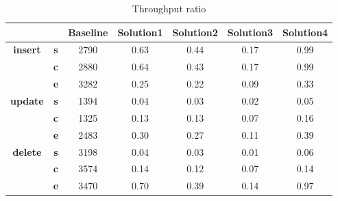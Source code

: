 \begin{table}[h]
\centering
\caption{Throughput ratio}\label{t:}
\begin{tabular}{ccccccc}
\toprule
&&\textbf{Baseline} & \textbf{Solution1} & \textbf{Solution2} & \textbf{Solution3} & \textbf{Solution4}\\
\midrule
\multirow{3}{*}{\textbf{insert}} & \textbf{s} & 2790 & 0.63 & 0.44 & 0.17 & 0.99\\
 & \textbf{c} & 2880 & 0.64 & 0.43 & 0.17 & 0.99\\
 & \textbf{e} & 3282 & 0.25 & 0.22 & 0.09 & 0.33\\
\midrule
\multirow{3}{*}{\textbf{update}} & \textbf{s} & 1394 & 0.04 & 0.03 & 0.02 & 0.05\\
 & \textbf{c} & 1325 & 0.13 & 0.13 & 0.07 & 0.16\\
 & \textbf{e} & 2483 & 0.30 & 0.27 & 0.11 & 0.39\\
\midrule
\multirow{3}{*}{\textbf{delete}} & \textbf{s} & 3198 & 0.04 & 0.03 & 0.01 & 0.06\\
 & \textbf{c} & 3574 & 0.14 & 0.12 & 0.07 & 0.14\\
 & \textbf{e} & 3470 & 0.70 & 0.39 & 0.14 & 0.97\\
\bottomrule
\end{tabular}
\end{table}






